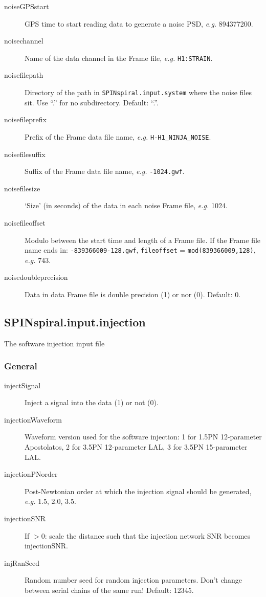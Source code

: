 \documentclass[10pt]{article}
\begin{document}
\begin{description}
\item[noiseGPSstart] GPS time to start reading data to generate a noise PSD,  \textit{e.g.} 894377200.
\item[noisechannel] Name of the data channel in the Frame file, \textit{e.g.} \texttt{H1:STRAIN}.
\item[noisefilepath] Directory of the path in \texttt{SPINspiral.input.system} where the noise files sit.  Use ``.'' for no subdirectory.  Default: ``.''.
\item[noisefileprefix] Prefix of the Frame data file name, \textit{e.g.} \texttt{H-H1\_NINJA\_NOISE}.
\item[noisefilesuffix] Suffix of the Frame data file name, \textit{e.g.} \texttt{-1024.gwf}.
\item[noisefilesize] `Size' (in seconds) of the data in each noise Frame file,  \textit{e.g.} 1024.
\item[noisefileoffset]  Modulo between the start time and length of a Frame file.  If the Frame file name ends in: \texttt{-839366009-128.gwf}, \texttt{fileoffset} = \texttt{mod(839366009,128)},  \textit{e.g.} 743.
\item[noisedoubleprecision] Data in data Frame file is double precision (1) or nor (0).  Default: 0.
\end{description}






\pagebreak
\subsection{SPINspiral.input.injection}
The software injection input file


\subsubsection{General}
\begin{description}
\item[injectSignal] Inject a signal into the data (1) or not (0).
\item[injectionWaveform] Waveform version used for the software injection:  1 for 1.5PN 12-parameter Apostolatos, 2 for 3.5PN 12-parameter LAL, 3 for 3.5PN 15-parameter LAL.
\item[injectionPNorder] Post-Newtonian order at which the injection signal should be generated, \textit{e.g.} 1.5, 2.0, 3.5.
\item[injectionSNR] If $>0$: scale the distance such that the injection network SNR becomes injectionSNR.
\item[injRanSeed] Random number seed for random injection parameters. Don't change between serial chains of the same run!  Default: 12345.
\end{description}
\end{document}
